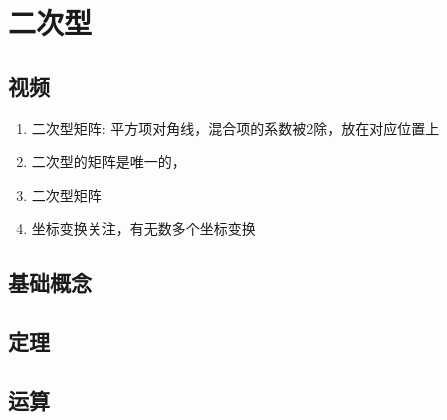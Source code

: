 \documentclass[a4paper,12pt]{article}
\begin{document}


    \section{二次型}

    \subsection{视频}

    \begin{enumerate}
        \item 二次型矩阵: 平方项对角线，混合项的系数被2除，放在对应位置上
        \item 二次型的矩阵是唯一的，
        \item 二次型矩阵 \Leftrightarrow {} \quad \text{\color{red}{一一对应}}
        \item 坐标变换关注{\color{red}{系数行列式不为0(可逆矩阵)}}，有无数多个坐标变换
    \end{enumerate}

    \subsection{基础概念}

    \begin{enumerate}
    \end{enumerate}

    \subsection{定理}

    \begin{enumerate}
    \end{enumerate}

    \subsection{运算}

    \begin{enumerate}

    \end{enumerate}
\end{document}
